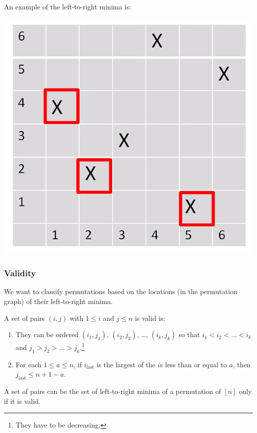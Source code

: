 \documentclass[letterpaper]{article}
\begin{document}
An example of the left-to-right minima is:
\begin{center}
    \includegraphics[scale=0.4]{img/selected_perm.PNG}
\end{center}

\subsubsection{Validity}
We want to classify permutations based on the locations (in the permutation graph) of their left-to-right minima.
\begin{definition}{}{}
    A set of pairs $(i, j)$ with $1 \leq i$ and $j \leq n$ is valid is:
    \begin{enumerate}
        \item They can be ordered $(i_1, j_1)$, $(i_2, j_2)$, \dots, $(i_k, j_k)$ so that $i_1 < i_2 < \dots < i_k$ and $j_1 > j_2 > \dots > j_k$.\footnote{They have to be decreasing.}
        \item For each $1 \leq a \leq n$, if $i_{\text{last}}$ is the largest of the $i$s less than or equal to $a$, then $j_{\text{last}} \leq n + 1 - a$.
    \end{enumerate}
\end{definition}

\begin{lemma}{}{}
    A set of pairs can be the set of left-to-right minima of a permutation of $[n]$ only if it is valid. 
\end{lemma}
\end{document}
